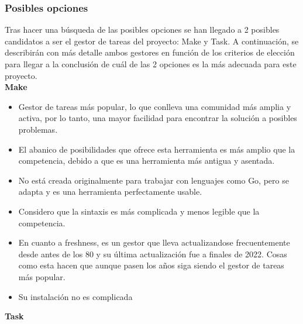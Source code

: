 \subsubsection{Posibles opciones}
Tras hacer una búsqueda de las posibles opciones se han llegado a 2
posibles candidatos a ser el gestor de tareas del proyecto: Make y Task.
A continuación, se describirán con más detalle ambos gestores en función
de los criterios de elección para llegar a la conclusión de cuál de las
2 opciones es la más adecuada para este proyecto.\\

\textbf{Make}

\begin{itemize}
\item
  Gestor de tareas más popular, lo que conlleva una comunidad más amplia
  y activa, por lo tanto, una mayor facilidad para encontrar la solución
  a posibles problemas.
\item
  El abanico de posibilidades que ofrece esta herramienta es más amplio
  que la competencia, debido a que es una herramienta más antigua y
  asentada.
\item
  No está creada originalmente para trabajar con lenguajes como Go, pero
  se adapta y es una herramienta perfectamente usable.
\item
  Considero que la sintaxis es más complicada y menos legible que la
  competencia.
\item
  En cuanto a freshness, es un gestor que lleva actualizandose
  frecuentemente desde antes de los 80 y su última actualización fue a
  finales de 2022. Cosas como esta hacen que aunque pasen los años siga
  siendo el gestor de tareas más popular.
\item
  Su instalación no es complicada
\end{itemize}

\textbf{Task}

